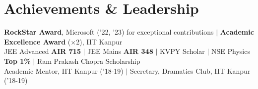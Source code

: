 \documentclass[a4paper,9pt]{extarticle}
\begin{document}
\section{Achievements \& Leadership}
 \begin{itemize}[leftmargin=0.15in, label={}]
    \small{\item{
      \textbf{RockStar Award}, Microsoft ('22, '23) for exceptional contributions $|$ \textbf{Academic Excellence Award} ($\times$2), IIT Kanpur \\
      JEE Advanced \textbf{AIR 715} $|$ JEE Mains \textbf{AIR 348} $|$ KVPY Scholar $|$ NSE Physics \textbf{Top 1\%} $|$ Ram Prakash Chopra Scholarship \\
      Academic Mentor, IIT Kanpur ('18-19) $|$ Secretary, Dramatics Club, IIT Kanpur ('18-19)
    }}
 \end{itemize}

\end{document}
